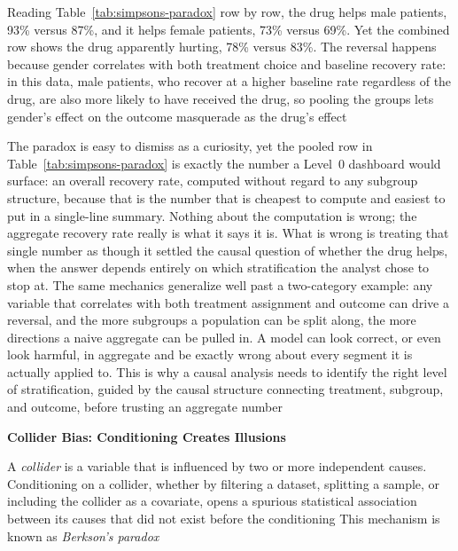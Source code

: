 Reading Table~\ref{tab:simpsons-paradox} row by row, the drug helps male
patients, 93\% versus 87\%, and it helps female patients, 73\% versus 69\%. Yet
the combined row shows the drug apparently hurting, 78\% versus 83\%. The
reversal happens because gender correlates with both treatment choice and
baseline recovery rate: in this data, male patients, who recover at a higher baseline
rate regardless of the drug, are also more likely to have received the drug, so pooling
the groups lets gender's effect on the outcome masquerade as the drug's effect

The paradox is easy to dismiss as a curiosity, yet the pooled row in Table~\ref{tab:simpsons-paradox}
is exactly the number a Level~0 dashboard would surface: an overall recovery
rate, computed without regard to any subgroup structure, because that is the
number that is cheapest to compute and easiest to put in a single-line summary. Nothing
about the computation is wrong; the aggregate recovery rate really is what it
says it is. What is wrong is treating that single number as though it settled the
causal question of whether the drug helps, when the answer depends entirely on
which stratification the analyst chose to stop at. The same mechanics generalize
well past a two-category example: any variable that correlates with both
treatment assignment and outcome can drive a reversal, and the more subgroups a population
can be split along, the more directions a naive aggregate can be pulled in. A model
can look correct, or even look harmful, in aggregate and be exactly wrong about every
segment it is actually applied to. This is why a causal analysis needs to
identify the right level of stratification, guided by the causal structure connecting
treatment, subgroup, and outcome, before trusting an aggregate number

\textbf{Collider Bias: Conditioning Creates Illusions}

\begin{definition}
  A \emph{collider} is a variable that is influenced by two or more independent
  causes. Conditioning on a collider, whether by filtering a dataset, splitting a
  sample, or including the collider as a covariate, opens a spurious statistical
  association between its causes that did not exist before the conditioning This
  mechanism is known as \emph{Berkson's paradox}
\end{definition}

